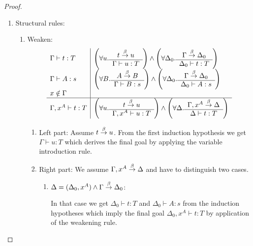 \begin{theorem}
{\begin{proof}
\begin{enumerate}
\begin{enumerate}
\begin{enumerate}
                    \item Right part: Immediate consequence of the induction
                        hypotheses.
                \end{enumerate}
            \end{enumerate}

            \item Structural rules:
            \begin{enumerate}
                \item Weaken:
                $$
                \begin{array}{l|l}
                \Gamma \vdash t : T
                &
                \left( \forall u. \begin{array}{c} t \stackrel{\beta}{\to} u \\ \hline \Gamma \vdash u: T\end{array} \right)
                \land
                \left( \forall \Delta_0. \begin{array}{c} \Gamma \stackrel{\beta}{\to} \Delta_0 \\ \hline \Delta_0 \vdash t: T\end{array} \right)
                \\
                \Gamma \vdash A : s
                &
                \left( \forall B. \begin{array}{c} A \stackrel{\beta}{\to} B \\ \hline \Gamma \vdash B: s\end{array} \right)
                \land
                \left( \forall \Delta_0. \begin{array}{c} \Gamma \stackrel{\beta}{\to} \Delta_0 \\ \hline \Delta_0 \vdash A: s\end{array} \right)
                \\
                x \notin \Gamma
                \\
                \hline
                \Gamma, x^A \vdash t : T
                &
                \left( \forall u. \begin{array}{c} t \stackrel{\beta}{\to} u \\ \hline \Gamma, x^A \vdash u: T\end{array} \right)
                \land
                \left( \forall \Delta. \begin{array}{c} \Gamma,x^A \stackrel{\beta}{\to} \Delta \\ \hline \Delta \vdash t: T\end{array} \right)
                \end{array}
                $$
                \begin{enumerate}
                    \item Left part: Assume $t \stackrel{\beta}{\to} u$. From the first
                        induction hypothesis we get $\Gamma \vdash u : T$ which
                        derives the final goal by applying the variable
                        introduction rule.

                    \item Right part:
                        We assume $\Gamma,x^A \stackrel{\beta}{\to} \Delta$ and have to
                        distinguish two cases.
                        \begin{enumerate}
                        \item
                            $\Delta = (\Delta_0, x^A)
                            \land \Gamma \stackrel{\beta}{\to} \Delta_0$:

                            In that case we get $\Delta_0 \vdash t : T$ and
                                $\Delta_0 \vdash A : s$ from the induction
                                hypotheses which imply the final goal $\Delta_0,
                                x^A \vdash t : T$ by application of the
                                weakening rule.


\end{enumerate}
\end{enumerate}
\end{enumerate}
\end{enumerate}
\end{proof}}
\end{theorem}
